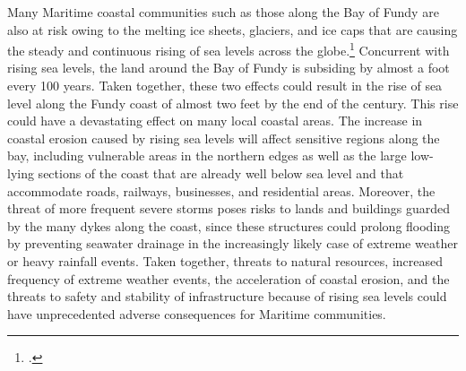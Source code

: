 \documentclass[10pt]{article}
\begin{document}
Many Maritime coastal communities such as those along the Bay of Fundy are also at risk owing to the melting ice sheets, glaciers, and ice caps that are causing the steady and continuous rising of sea levels across the globe.\footcite[][]{PercyRisingTide}
Concurrent with rising sea levels, the land around the Bay of Fundy is subsiding by almost a foot every 100 years.
Taken together, these two effects could result in the rise of sea level along the Fundy coast of almost two feet by the end of the century.
This rise could have a devastating effect on many local coastal areas.
The increase in coastal erosion caused by rising sea levels will affect sensitive regions along the bay, including vulnerable areas in the northern edges as well as the large low-lying sections of the coast that are already well below sea level and that accommodate roads, railways, businesses, and residential areas. 
Moreover, the threat of more frequent severe storms poses risks to lands and buildings guarded by the many dykes along the coast, since these structures could prolong flooding by preventing seawater drainage in the increasingly likely case of extreme weather or heavy rainfall events. 
Taken together, threats to natural resources, increased frequency of extreme weather events, the acceleration of coastal erosion, and the threats to safety and stability of infrastructure because of rising sea levels could have unprecedented adverse consequences for Maritime communities. 
\end{document}
